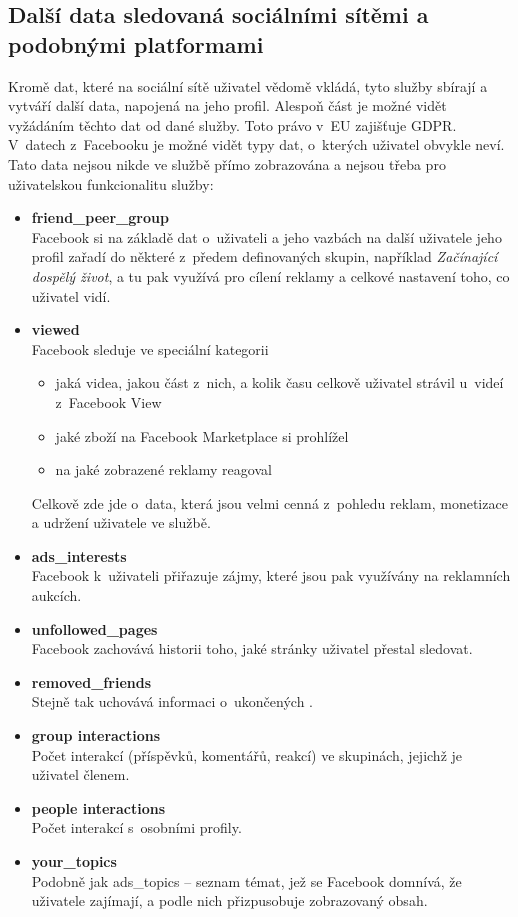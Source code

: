\subsection{Další data sledovaná sociálními sítěmi a podobnými platformami}
Kromě dat, které na sociální sítě uživatel vědomě vkládá, tyto služby sbírají a vytváří další data, napojená na jeho profil. Alespoň část je možné vidět vyžádáním těchto dat od dané služby. Toto právo v~EU zajišťuje GDPR.\\
V~datech z~Facebooku je možné vidět typy dat, o~kterých uživatel obvykle neví. Tato data nejsou nikde ve službě přímo zobrazována a nejsou třeba pro uživatelskou funkcionalitu služby:
\begin{itemize}
	\item \textbf{friend\_peer\_group}\\
	Facebook si na základě dat o~uživateli a jeho vazbách na další uživatele jeho profil zařadí do některé z~předem definovaných skupin, například \textit{Začínající dospělý život}, a tu pak využívá pro cílení reklamy a celkové nastavení toho, co uživatel vidí.
	
	\item \textbf{viewed}\\
	Facebook sleduje ve speciální kategorii
	\begin{itemize}
		\item jaká videa, jakou část z~nich, a kolik času celkově uživatel strávil u~videí z~Facebook View
		\item jaké zboží na Facebook Marketplace si prohlížel
		\item na jaké zobrazené reklamy reagoval
	\end{itemize}
	Celkově zde jde o~data, která jsou velmi cenná z~pohledu reklam, monetizace a udržení uživatele ve službě.
	
	\item \textbf{ads\_interests}\\
	Facebook k~uživateli přiřazuje zájmy, které jsou pak využívány na reklamních aukcích.

	\item \textbf{unfollowed\_pages}\\
	Facebook zachovává historii toho, jaké stránky uživatel přestal sledovat.

	\item \textbf{removed\_friends}\\
	Stejně tak uchovává informaci o~ukončených .

	\item \textbf{group interactions}\\
	Počet interakcí (příspěvků, komentářů, reakcí) ve skupinách, jejichž je uživatel členem.

	\item \textbf{people interactions}\\
	Počet interakcí s~osobními profily.

	\item \textbf{your\_topics}\\
	Podobně jak ads\_topics -- seznam témat, jež se Facebook domnívá, že uživatele zajímají, a podle nich přizpusobuje zobrazovaný obsah.
\end{itemize}

